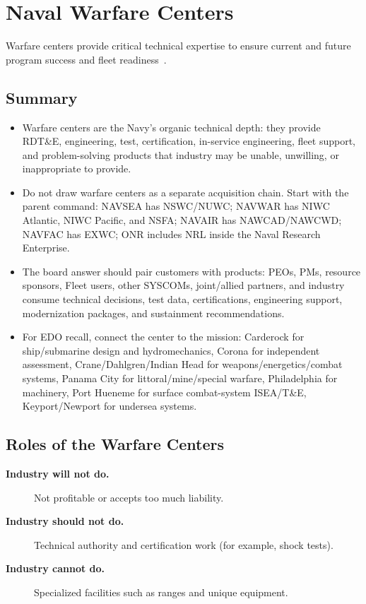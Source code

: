 \documentclass[../main.tex]{subfiles}
\begin{document}
\section{Naval Warfare Centers}
Warfare centers provide critical technical expertise to ensure current and future program success and fleet readiness~\autocite{edo-2-1-4-warfare-centers-2024}.

\subsection{Summary}
\begin{itemize}
  \item Warfare centers are the Navy's organic technical depth: they provide RDT\&E, engineering, test, certification, in-service engineering, fleet support, and problem-solving products that industry may be unable, unwilling, or inappropriate to provide.
  \item Do not draw warfare centers as a separate acquisition chain. Start with the parent command: NAVSEA has NSWC/NUWC; NAVWAR has NIWC Atlantic, NIWC Pacific, and NSFA; NAVAIR has NAWCAD/NAWCWD; NAVFAC has EXWC; ONR includes NRL inside the Naval Research Enterprise.
  \item The board answer should pair customers with products: PEOs, PMs, resource sponsors, Fleet users, other SYSCOMs, joint/allied partners, and industry consume technical decisions, test data, certifications, engineering support, modernization packages, and sustainment recommendations.
  \item For EDO recall, connect the center to the mission: Carderock for ship/submarine design and hydromechanics, Corona for independent assessment, Crane/Dahlgren/Indian Head for weapons/energetics/combat systems, Panama City for littoral/mine/special warfare, Philadelphia for machinery, Port Hueneme for surface combat-system ISEA/T\&E, Keyport/Newport for undersea systems.
\end{itemize}

\subsection{Roles of the Warfare Centers}
\begin{description}
  \item[\textbf{Industry will not do.}] Not profitable or accepts too much liability.
  \item[\textbf{Industry should not do.}] Technical authority and certification work (for example, shock tests).
  \item[\textbf{Industry cannot do.}] Specialized facilities such as ranges and unique equipment.
\end{description}
\end{document}
